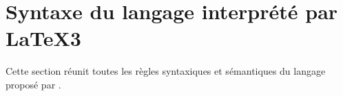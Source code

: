\documentclass{tutodoc}
\begin{document}
\section{Syntaxe du langage interprété par \LaTeX3} \label{tns-math-functab-dsl-l3}

Cette section réunit toutes les règles syntaxiques et sémantiques du langage proposé par \thisproj.
\end{document}
